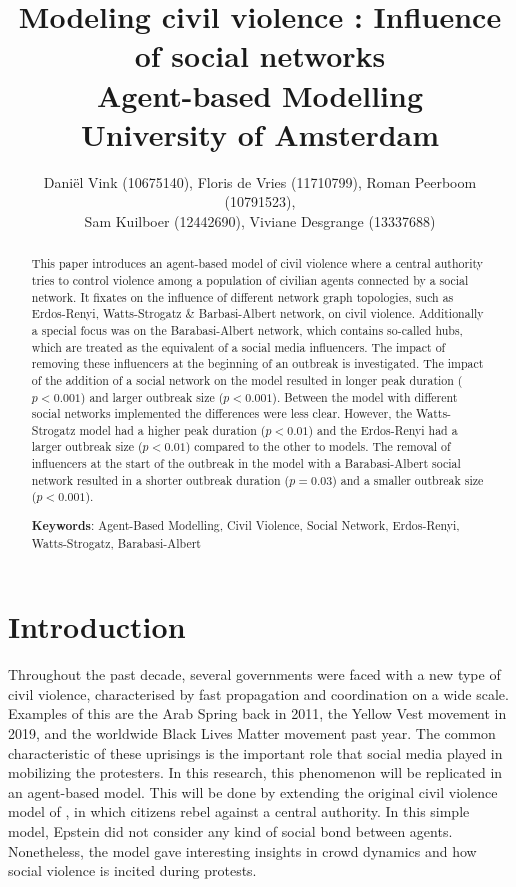 \documentclass[10pt]{article}
\title{Modeling civil violence : Influence of social networks \large \\ Agent-based Modelling \\University of Amsterdam\\}
\author{Daniël Vink (10675140), Floris de Vries (11710799), Roman Peerboom (10791523),\\ Sam Kuilboer (12442690), Viviane Desgrange (13337688)}
\date{}
\begin{document}
    \maketitle

    \begin{abstract}
    {\normalsize  This paper introduces an agent-based model of civil violence where a central authority tries to control violence among a population of civilian agents connected by a social network. It fixates on the influence of different network graph topologies, such as Erdos-Renyi, Watts-Strogatz \& Barbasi-Albert network, on civil violence. Additionally a special focus was on the Barabasi-Albert network, which contains so-called hubs, which are treated as the equivalent of a social media influencers. The impact of removing these influencers at the beginning of an outbreak is investigated.
    The impact of the addition of a social network on the model resulted in longer peak duration ($p<0.001$) and larger outbreak size ($p<0.001$). Between the model with different social networks implemented the differences were less clear. However, the Watts-Strogatz model had a higher peak duration ($p<0.01$) and the Erdos-Renyi had a larger outbreak size ($p<0.01$) compared to the other to models. The removal of influencers at the start of the outbreak in the model with a Barabasi-Albert social network resulted in a shorter outbreak duration ($p = 0.03$) and a smaller outbreak size ($p < 0.001$).
    }

        \smallskip
        \noindent
        {\normalsize \textbf{Keywords}: Agent-Based Modelling, Civil Violence, Social Network, Erdos-Renyi, Watts-Strogatz, Barabasi-Albert}
    \end{abstract}

    \newpage

    \section*{Introduction}
    Throughout the past decade, several governments were faced with a new type of civil violence, characterised by fast propagation and coordination on a wide scale. Examples of this are the Arab Spring back in 2011, the Yellow Vest movement in 2019, and the worldwide Black Lives Matter movement past year. The common characteristic of these uprisings is the important role that social media played in mobilizing the protesters. In this research, this phenomenon will be replicated in an agent-based model.
    This will be done by extending the original civil violence model of \cite{epstein2002}, in which citizens rebel against a central authority. In this simple model, Epstein did not consider any kind of social bond between agents. Nonetheless, the model gave interesting insights in crowd dynamics and how social violence is incited during protests.
\end{document}
